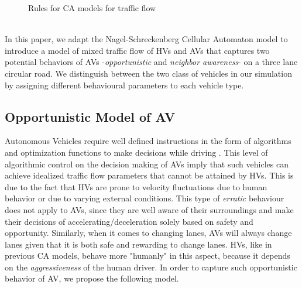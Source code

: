 \documentclass[oneside,letter,11pt]{article}
\begin{document}
\begin{figure}[H]
  \centering
  \hfill
  \caption{Rules for CA models for traffic flow}
  \label{fig:ca}
\end{figure}


\\In this paper, we adapt the Nagel-Schreckenberg Cellular Automaton model to introduce a model of mixed traffic flow of HVs and AVs that captures two potential behaviors of AVs -\textit{opportunistic} and \textit{neighbor awareness}- on a three lane circular road. We distinguish between the two class of vehicles in our simulation by assigning different behavioural parameters to each vehicle type.

\subsection{Opportunistic Model of AV}\label{ss:2}
Autonomous Vehicles require well defined instructions in the form of algorithms and optimization functions to make decisions while driving \cite{pp:1}. This level of algorithmic control on the decision making of AVs imply that such vehicles can achieve idealized traffic flow parameters that cannot be attained by HVs. This is due to the fact that HVs are prone to velocity fluctuations due to human behavior or due to varying external conditions. This type of \textit{erratic} behaviour does not apply to AVs, since they are well aware of their surroundings and make their decisions of accelerating/deceleration solely based on safety and opportunity. Similarly, when it comes to changing lanes, AVs will always change lanes given that it is both safe and rewarding to change lanes. HVs, like in previous CA models, behave more "humanly" in this aspect, because it depends on the \textit{aggressiveness} of the human driver. In order to capture such opportunistic behavior of AV, we propose the following model.
\end{document}
